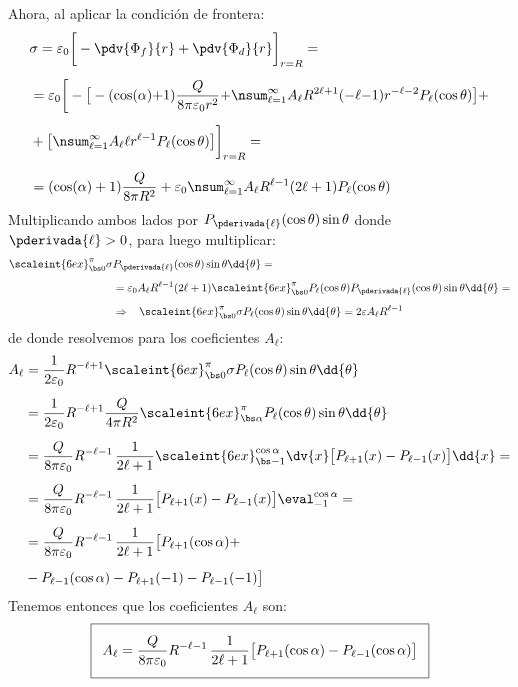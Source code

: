 \begin{enumerate}
Ahora, al aplicar la condición de frontera:
\begin{align*}
&\sigma = \varepsilon_{0} \bigg[ - \pdv{\Phi_{f}}{r} + \pdv{\Phi_{d}}{r} \bigg]_{r=R} = \\[0.5em]
&=  \varepsilon_{0} \bigg[ - \big[ - (\cos (\alpha) {+} 1) \dfrac{Q}{8 \pi \varepsilon_{0} r^{2}} {+} \nsum_{\ell=1}^{\infty} A_{\ell} R^{2\ell+1} (-\ell {-} 1) r^{-\ell-2} P_{\ell} (\cos \theta) \big] + \\[0.5em]
&+ \big[ \nsum_{\ell=1}^{\infty} A_{\ell} \ell r^{\ell-1} P_{\ell} (\cos \theta) \big] \bigg]_{r=R} = \\[0.5em]
&= (\cos (\alpha) + 1) \dfrac{Q}{8 \pi R^{2}} + \varepsilon_{0} \nsum_{\ell=1}^{\infty} A_{\ell} R^{\ell-1} (2 \ell + 1) P_{\ell} (\cos \theta)
\end{align*}
Multiplicando ambos lados por $P_{\pderivada{\ell}} (\cos \theta) \sin \theta$ donde $\pderivada{\ell} > 0$, para luego multiplicar:
\begin{align*}
\scaleint{6ex}_{\bs 0}^{\pi} \sigma &P_{\pderivada{\ell}} (\cos \theta) \sin \theta \dd{\theta} = \\[0.5em]
&= \varepsilon_{0} A_{\ell} R^{\ell-1} (2 \ell + 1) \scaleint{6ex}_{\bs 0}^{\pi} P_{\ell} (\cos \theta) P_{\pderivada{\ell}} (\cos \theta) \sin \theta \dd{\theta} = \\[0.5em]
&\Rightarrow \hspace{0.3cm} \scaleint{6ex}_{\bs 0}^{\pi} \sigma P_{\ell} (\cos \theta) \sin \theta \dd{\theta} = 2 \varepsilon A_{\ell} R^{\ell-1}
\end{align*}
de donde resolvemos para los coeficientes $A_{\ell}$:
\begin{align*}
A_{\ell} &= \dfrac{1}{2 \varepsilon_{0}} R^{-\ell+1} \scaleint{6ex}_{\bs 0}^{\pi} \sigma P_{\ell} (\cos \theta) \sin \theta \dd{\theta} \\[0.5em]
&= \dfrac{1}{2 \varepsilon_{0}} R^{-\ell+1} \dfrac{Q}{4 \pi R^{2}} \scaleint{6ex}_{\bs \alpha}^{\pi} P_{\ell} (\cos \theta) \sin \theta \dd{\theta} \\[0.5em]
&= \dfrac{Q}{8 \pi \varepsilon_{0}} R^{-\ell-1} \, \dfrac{1}{2 \ell + 1} \scaleint{6ex}_{\bs -1}^{\cos \alpha} \dv{x} \big[ P_{\ell+1} (x) - P_{\ell-1} (x) \big] \dd{x} = \\[0.5em]
&= \dfrac{Q}{8 \pi \varepsilon_{0}} R^{-\ell-1} \, \dfrac{1}{2 \ell + 1} \big[ P_{\ell+1} (x) - P_{\ell-1} (x) \big] \eval_{-1}^{\cos \alpha} = \\[0.5em]
&= \dfrac{Q}{8 \pi \varepsilon_{0}} R^{-\ell-1} \, \dfrac{1}{2 \ell + 1} \big[ P_{\ell+1} (\cos \alpha) + \\[0.5em]
&- P_{\ell-1} (\cos \alpha) - P_{\ell+1} (-1) - P_{\ell-1} (-1) \big]
\end{align*}
Tenemos entonces que los coeficientes $A_{\ell}$ son:
\begin{align*}
\addtolength{\fboxsep}{5pt}\boxed{
A_{\ell} = \dfrac{Q}{8 \pi \varepsilon_{0}} R^{-\ell-1} \, \dfrac{1}{2 \ell + 1} \big[ P_{\ell+1} (\cos \alpha) - P_{\ell-1} (\cos \alpha) \big] }
\end{align*}


\end{enumerate}
